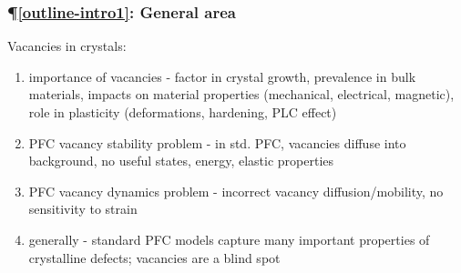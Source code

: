 \documentclass[%
 reprint,
 amsmath,amssymb,
 aps,
 prl,
]{revtex4-2}
\begin{document}
\subsubsection*{} %
\subsubsection*{\P \ref{outline-intro1}: General area}
Vacancies in crystals: 
\begin{enumerate}
    \item importance of vacancies - factor in crystal growth, prevalence in bulk materials, impacts on material properties (mechanical, electrical, magnetic), role in plasticity (deformations, hardening, PLC effect)
    \item PFC vacancy stability problem - in std. PFC, vacancies diffuse into background, no useful states, energy, elastic properties
    \item PFC vacancy dynamics problem - incorrect vacancy diffusion/mobility, no sensitivity to strain
    \item generally - standard PFC models capture many important properties of crystalline defects; vacancies are a blind spot
\end{enumerate}
%
\end{document}
